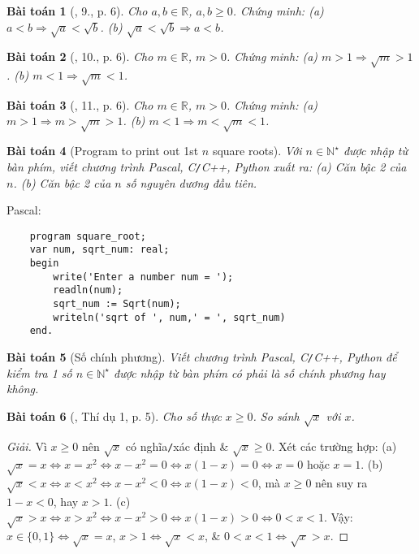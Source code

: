 \documentclass{article}
\newtheorem{baitoan}{Bài toán}
\begin{document}
\begin{baitoan}[\cite{SBT_Toan_9_tap_1}, 9., p. 6]
	Cho $a,b\in\mathbb{R}$, $a,b\ge0$. Chứng minh: (a) $a < b\Rightarrow\sqrt{a} < \sqrt{b}$. (b) $\sqrt{a} < \sqrt{b}\Rightarrow a < b$. 
\end{baitoan}

\begin{baitoan}[\cite{SBT_Toan_9_tap_1}, 10., p. 6]
	Cho $m \in\mathbb{R}$, $m > 0$. Chứng minh: (a) $m > 1\Rightarrow\sqrt{m} > 1$. (b) $m < 1\Rightarrow\sqrt{m} < 1$.
\end{baitoan}

\begin{baitoan}[\cite{SBT_Toan_9_tap_1}, 11., p. 6]
	Cho $m \in\mathbb{R}$, $m > 0$. Chứng minh: (a) $m > 1\Rightarrow m > \sqrt{m} > 1$. (b) $m < 1\Rightarrow m < \sqrt{m} < 1$.
\end{baitoan}

\begin{baitoan}[Program to print out 1st $n$ square roots]
	Với $n\in\mathbb{N}^\star$ được nhập từ bàn phím, viết chương trình {\sf Pascal, C\texttt{/}C++, Python} xuất ra: (a) Căn bậc 2 của $n$. (b) Căn bậc 2 của $n$ số nguyên dương đầu tiên. 
\end{baitoan}
Pascal:
\begin{verbatim}
	program square_root;
	var num, sqrt_num: real;		
	begin
	    write('Enter a number num = ');
	    readln(num);
	    sqrt_num := Sqrt(num);
	    writeln('sqrt of ', num,' = ', sqrt_num)
	end.
\end{verbatim}

\begin{baitoan}[Số chính phương]
	Viết chương trình {\sf Pascal, C\texttt{/}C++, Python} để kiểm tra 1 số $n\in\mathbb{N}^\star$ được nhập từ bàn phím có phải là số chính phương hay không.
\end{baitoan}

\begin{baitoan}[\cite{Tuyen_Toan_9}, Thí dụ 1, p. 5]
	Cho số thực $x\ge0$. So sánh $\sqrt{x}$ với $x$.
\end{baitoan}

\begin{proof}[Giải]
	Vì $x\ge0$ nên $\sqrt{x}$ có nghĩa\texttt{/}xác định \& $\sqrt{x}\ge0$. Xét các trường hợp: (a) $\sqrt{x} = x\Leftrightarrow x = x^2\Leftrightarrow x - x^2 = 0\Leftrightarrow x(1 - x) = 0\Leftrightarrow x = 0$ hoặc $x = 1$. (b) $\sqrt{x} < x\Leftrightarrow x < x^2\Leftrightarrow x - x^2 < 0\Leftrightarrow x(1 - x) < 0$, mà $x\ge0$ nên suy ra $1 - x < 0$, hay $x > 1$. (c) $\sqrt{x} > x\Leftrightarrow x > x^2\Leftrightarrow x - x^2 > 0\Leftrightarrow x(1 - x) > 0\Leftrightarrow 0 < x < 1$. Vậy: $x\in\{0,1\}\Leftrightarrow\sqrt{x} = x$, $x > 1\Leftrightarrow\sqrt{x} < x$, \& $0 < x < 1\Leftrightarrow\sqrt{x} > x$.
\end{proof}
\end{document}
